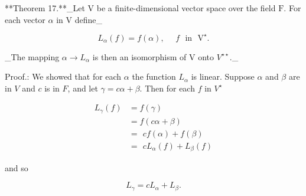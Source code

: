 **Theorem 17.**_Let \(\mathrm{V}\) be a finite-dimensional vector space over the field \(\mathrm{F}\). For each vector \(\alpha\) in \(\mathrm{V}\) define_

\[L_{\alpha}(f)=f(\alpha),\ \ \ \ \ \ f\ \ \ \mbox{in}\ \ \ \mathrm{V}^{\star}.\]

_The mapping \(\alpha\to L_{\alpha}\) is then an isomorphism of \(\mathrm{V}\) onto \(V^{\star\star}\)._

Proof.: We showed that for each \(\alpha\) the function \(L_{\alpha}\) is linear. Suppose \(\alpha\) and \(\beta\) are in \(V\) and \(c\) is in \(F\), and let \(\gamma=c\alpha+\beta\). Then for each \(f\) in \(V^{\star}\)

\[\begin{array}{rl}L_{\gamma}(f)&=f(\gamma)\\ &=f(c\alpha+\beta)\\ &=\ \,cf(\alpha)+f(\beta)\\ &=\ \,cL_{\alpha}(f)+L_{\beta}(f)\end{array}\]

and so

\[L_{\gamma}=cL_{\alpha}+L_{\beta}.\]